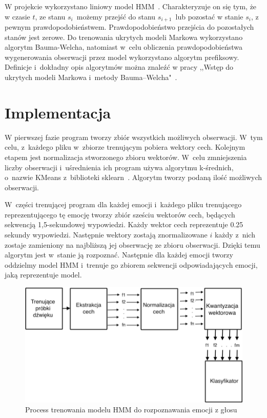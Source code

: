 \documentclass[declaration,shortabstract]{iithesis}
\begin{document}
W projekcie wykorzystano liniowy model HMM~\cite[Chapter~8.1]{HMM_pattern}. Charakteryzuje on się tym, że w czasie $t$, ze stanu $s_{i}$~możemy przejść do stanu $s_{i+1}$~lub pozostać w stanie $s_{i}$, z pewnym prawdopodobieństwem. Prawdopodobieństwo przejścia do pozostałych stanów jest zerowe. Do trenowania ukrytych modeli Markowa wykorzystano algorytm Bauma-Welcha, natomiast w~celu obliczenia prawdopodobieństwa wygenerowania obserwacji przez model wykorzystano algorytm prefiksowy. Definicje i~dokładny opis algorytmów można znaleźć w pracy ,,Wstęp do ukrytych modeli Markowa i~metody Bauma–Welcha"~\cite{HMM_Wstep}.

\section{Implementacja}
W pierwszej fazie program tworzy zbiór wszystkich możliwych obserwacji. W~tym celu, z~każdego pliku w~zbiorze trenującym pobiera wektory cech. Kolejnym etapem jest normalizacja stworzonego zbioru wektorów. W~celu zmniejszenia liczby obserwacji i~uśrednienia ich program używa algorytmu k-średnich, o~nazwie KMeans z~biblioteki sklearn~\cite{sklearn}. Algorytm tworzy podaną ilość możliwych obserwacji.

W~części trenującej program dla każdej emocji i~każdego pliku trenującego reprezentującego tę emocję tworzy zbiór sześciu wektorów cech, będących sekwencją 1,5-sekundowej wypowiedzi. Każdy wektor cech reprezentuje 0.25 sekundy wypowiedzi. Następnie wektory zostają znormalizowane $i$ każdy z~nich zostaje zamieniony na najbliższą jej obserwację ze zbioru obserwacji. Dzięki temu algorytm jest w~stanie ją rozpoznać. Następnie dla każdej emocji tworzy oddzielmy model HMM i~trenuje go zbiorem sekwencji odpowiadających emocji, jaką reprezentuje model.

\begin{figure}[!ht]
\hspace*{-5cm}  
	\caption{Process trenowania modelu HMM do rozpoznawania emocji z głosu}
	\includegraphics[scale=0.35]{hmm_train.png}
\end{figure}
\end{document}
